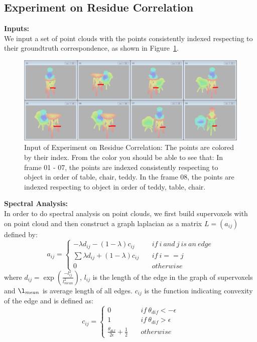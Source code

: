 \subsection{Experiment on Residue Correlation}
\label{subsec:exp:res}
\textbf{Inputs:}\\
We input a set of point clouds with the points consistently indexed respecting to their groundtruth correspondence, as shown in Figure~\ref{fig:input_for_exp_res}.\\
\begin{figure}
	\centering
	\includegraphics[width=\textwidth]{images/exp_res/inputs.png}
	\caption{Input of Experiment on Residue Correlation: The points are colored by their index. From the color you should be able to see that: In frame 01 - 07, the points are indexed consistently respecting to object in order of table, chair, teddy. In the frame 08, the points are indexed respecting to object in order of teddy, table, chair.}
	\label{fig:input_for_exp_res}
\end{figure}
\textbf{Spectral Analysis:}\\
In order to do spectral analysis on point clouds, we first build supervoxels with \cite{Supervoxels} on point cloud and then construct a graph laplacian as a matrix $L=(a_{ij})$ defined by:
$$ a_{ij}=\left\{
\begin{aligned}
-\lambda d_{ij}-(1-\lambda) c_{ij} &~&if~i~and~j~is~an~edge\\
\sum\lambda d_{ij}+(1-\lambda) c_{ij} &~&if~i==j\\
0 &~&otherwise
\end{aligned}
\right.
$$
where $d_{ij}=\exp(\frac{-l_{ij}^2}{l_{mean}^2})$, $l_{ij}$ is the length of the edge in the graph of supervoxels and $\l_{mean}$ is average length of all edges.  $c_{ij}$ is the function indicating convexity of the edge and is defined as:
$$ c_{ij}=\left\{
\begin{aligned}
0 &~&if~\theta_{dif}<-\epsilon\\
1 &~&if~\theta_{dif}>\epsilon\\
\frac{\theta_{dif}}{2\epsilon}+\frac{1}{2} &~&otherwise
\end{aligned}
\right.
$$
